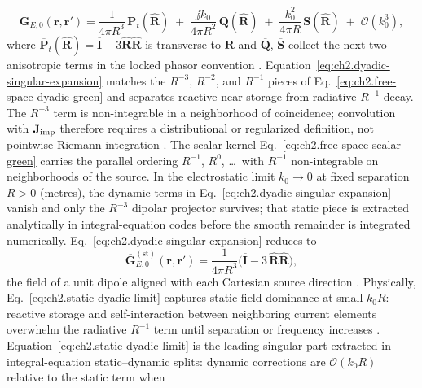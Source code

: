\begin{equation}
\label{eq:ch2.dyadic-singular-expansion}
\overline{\mathbf{G}}_{E,0}(\mathbf{r},\mathbf{r}')
=
\frac{1}{4\pi R^{3}}\,\overline{\mathbf{P}}_{t}(\widehat{\mathbf{R}})
\;+\;
\frac{\jj k_0}{4\pi R^{2}}\,\overline{\mathbf{Q}}(\widehat{\mathbf{R}})
\;+\;
\frac{k_0^{2}}{4\pi R}\,\overline{\mathbf{S}}(\widehat{\mathbf{R}})
\;+\;\mathcal{O}(k_0^{3}),
\end{equation}
where \(\overline{\mathbf{P}}_{t}(\widehat{\mathbf{R}})=\overline{\mathbf{I}}-3\widehat{\mathbf{R}}\widehat{\mathbf{R}}\)
is transverse to \(\mathbf{R}\) and \(\overline{\mathbf{Q}}\), \(\overline{\mathbf{S}}\)
collect the next two anisotropic terms in the locked phasor convention
\cite{harrington2001}. Equation~\eqref{eq:ch2.dyadic-singular-expansion} matches the
\(R^{-3}\), \(R^{-2}\), and \(R^{-1}\) pieces of
Eq.~\eqref{eq:ch2.free-space-dyadic-green} and separates reactive near storage from
radiative \(R^{-1}\) decay. The \(R^{-3}\) term is non-integrable in a neighborhood
of coincidence; convolution with \(\mathbf{J}_{\mathrm{imp}}\) therefore requires a distributional or
regularized definition, not pointwise Riemann integration
\cite{stratton1941}. The scalar kernel Eq.~\eqref{eq:ch2.free-space-scalar-green}
carries the parallel ordering \(R^{-1}\), \(R^{0}\), \ldots\ with
\(R^{-1}\) non-integrable on neighborhoods of the source.
In the electrostatic limit \(k_0\to 0\) at fixed separation \(R>0\) (metres), the dynamic
terms in Eq.~\eqref{eq:ch2.dyadic-singular-expansion} vanish and only the \(R^{-3}\)
dipolar projector survives; that static piece is extracted analytically in
integral-equation codes before the smooth remainder is integrated numerically.
Eq.~\eqref{eq:ch2.dyadic-singular-expansion} reduces to
\begin{equation}
\label{eq:ch2.static-dyadic-limit}
\overline{\mathbf{G}}_{E,0}^{\mathrm{(st)}}(\mathbf{r},\mathbf{r}')
=
\frac{1}{4\pi R^{3}}\Big(\overline{\mathbf{I}}-3\,\widehat{\mathbf{R}}\widehat{\mathbf{R}}\Big),
\end{equation}
the field of a unit dipole aligned with each Cartesian source direction
\cite{jackson1999}. Physically, Eq.~\eqref{eq:ch2.static-dyadic-limit} captures static-field
dominance at small $k_0 R$: reactive storage and self-interaction between neighboring
current elements overwhelm the radiative $R^{-1}$ term until separation or frequency
increases \cite{stratton1941}. Equation~\eqref{eq:ch2.static-dyadic-limit} is the
leading singular part extracted in integral-equation static--dynamic splits: dynamic
corrections are \(\mathcal{O}(k_0 R)\) relative to the static term when
